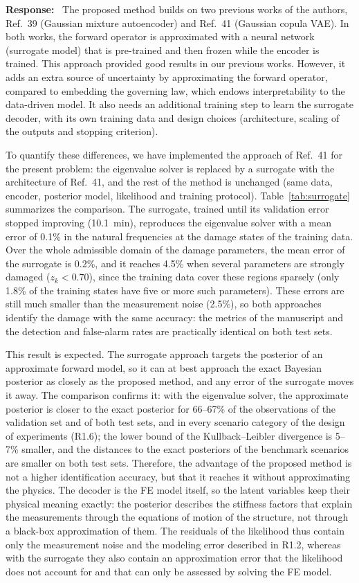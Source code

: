 \documentclass[11pt]{article}
\newenvironment{response}{\par\smallskip\noindent\color{resp}\textbf{Response:}\ }{\par}
\begin{document}
\begin{response}
The proposed method builds on two previous works of the authors, Ref.~39 (Gaussian mixture autoencoder) and Ref.~41 (Gaussian copula VAE).
In both works, the forward operator is approximated with a neural network (surrogate model) that is pre-trained and then frozen while the encoder is trained.
This approach provided good results in our previous works.
However, it adds an extra source of uncertainty by approximating the forward operator, compared to embedding the governing law, which endows interpretability to the data-driven model.
It also needs an additional training step to learn the surrogate decoder, with its own training data and design choices (architecture, scaling of the outputs and stopping criterion).

To quantify these differences, we have implemented the approach of Ref.~41 for the present problem: the eigenvalue solver is replaced by a surrogate with the architecture of Ref.~41, and the rest of the method is unchanged (same data, encoder, posterior model, likelihood and training protocol).
Table~\ref{tab:surrogate} summarizes the comparison.
The surrogate, trained until its validation error stopped improving (10.1~min), reproduces the eigenvalue solver with a mean error of 0.1\% in the natural frequencies at the damage states of the training data.
Over the whole admissible domain of the damage parameters, the mean error of the surrogate is 0.2\%, and it reaches 4.5\% when several parameters are strongly damaged ($z_k<0.70$), since the training data cover these regions sparsely (only 1.8\% of the training states have five or more such parameters).
These errors are still much smaller than the measurement noise (2.5\%), so both approaches identify the damage with the same accuracy: the metrics of the manuscript and the detection and false-alarm rates are practically identical on both test sets.

This result is expected.
The surrogate approach targets the posterior of an approximate forward model, so it can at best approach the exact Bayesian posterior as closely as the proposed method, and any error of the surrogate moves it away.
The comparison confirms it: with the eigenvalue solver, the approximate posterior is closer to the exact posterior for 66--67\% of the observations of the validation set and of both test sets, and in every scenario category of the design of experiments (R1.6); the lower bound of the Kullback--Leibler divergence is 5--7\% smaller, and the distances to the exact posteriors of the benchmark scenarios are smaller on both test sets.
Therefore, the advantage of the proposed method is not a higher identification accuracy, but that it reaches it without approximating the physics.
The decoder is the FE model itself, so the latent variables keep their physical meaning exactly: the posterior describes the stiffness factors that explain the measurements through the equations of motion of the structure, not through a black-box approximation of them.
The residuals of the likelihood thus contain only the measurement noise and the modeling error described in R1.2, whereas with the surrogate they also contain an approximation error that the likelihood does not account for and that can only be assessed by solving the FE model.


\end{response}
\end{document}
